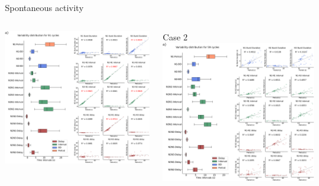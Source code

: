 \documentclass[aspectratio=43]{beamer}
\begin{document}
\begin{frame}{Spontaneous activity}
{\begin{columns}
\begin{column}{0.5\textwidth}
				\includegraphics[width=\textwidth]{invariants/data/SUSSEX/prep2/images/3phases/panel_with_intervals_boxplot_invariants.pdf}
			\end{column}
			\begin{column}{0.5\textwidth}
				\centering Case 2
				\includegraphics[width=\textwidth]{invariants/data/SUSSEX/prep3/images/3phases/panel_with_intervals_boxplot_invariants.pdf}
			\end{column}
		\end{columns}
	}
\end{frame}
\end{document}
